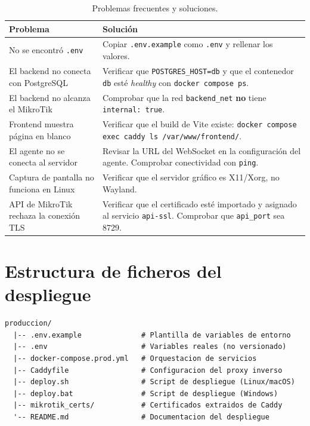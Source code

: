 \documentclass[12pt,a4paper]{article}
\begin{document}
\begin{table}[H]
\centering
\begin{tabularx}{\textwidth}{lX}
    \toprule
    \textbf{Problema} & \textbf{Solución} \\
    \midrule
    No se encontró \texttt{.env} & Copiar \texttt{.env.example} como \texttt{.env} y rellenar los valores. \\
    \addlinespace
    El backend no conecta con PostgreSQL & Verificar que \texttt{POSTGRES\_HOST=db} y que el contenedor \texttt{db} esté \textit{healthy} con \texttt{docker compose ps}. \\
    \addlinespace
    El backend no alcanza el MikroTik & Comprobar que la red \texttt{backend\_net} \textbf{no} tiene \texttt{internal: true}. \\
    \addlinespace
    Frontend muestra página en blanco & Verificar que el build de Vite existe: \texttt{docker compose exec caddy ls /var/www/frontend/}. \\
    \addlinespace
    El agente no se conecta al servidor & Revisar la URL del WebSocket en la configuración del agente. Comprobar conectividad con \texttt{ping}. \\
    \addlinespace
    Captura de pantalla no funciona en Linux & Verificar que el servidor gráfico es X11/Xorg, no Wayland. \\
    \addlinespace
    API de MikroTik rechaza la conexión TLS & Verificar que el certificado esté importado y asignado al servicio \texttt{api-ssl}. Comprobar que \texttt{api\_port} sea 8729. \\
    \bottomrule
\end{tabularx}
\caption{Problemas frecuentes y soluciones.}
\end{table}

\section{Estructura de ficheros del despliegue}

\begin{lstlisting}[language={},title={Estructura del directorio produccion/}]
produccion/
  |-- .env.example              # Plantilla de variables de entorno
  |-- .env                      # Variables reales (no versionado)
  |-- docker-compose.prod.yml   # Orquestacion de servicios
  |-- Caddyfile                 # Configuracion del proxy inverso
  |-- deploy.sh                 # Script de despliegue (Linux/macOS)
  |-- deploy.bat                # Script de despliegue (Windows)
  |-- mikrotik_certs/           # Certificados extraidos de Caddy
  '-- README.md                 # Documentacion del despliegue
\end{lstlisting}
\end{document}
